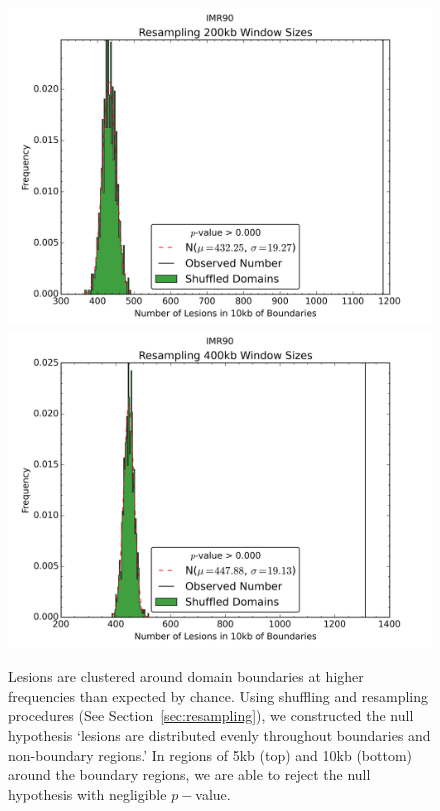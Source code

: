 \begin{figure}[H]
  \vfill

  \begin{minipage}{0.5\textwidth}%
    \includegraphics[width=\textwidth]{./figures/supplementary/domains/IMR90boundaries200kbwindows10000kbslop.png}
  \end{minipage}%
  \hfill
  \begin{minipage}{0.5\textwidth}
    \includegraphics[width=\textwidth]{./figures/supplementary/domains/IMR90boundaries400kbwindows10000kbslop.png}
  \end{minipage}
  \medskip
  \small
  Lesions are clustered around domain boundaries at higher frequencies than expected by chance.  Using shuffling and
  resampling procedures (See Section~\ref{sec:resampling}), we constructed the null hypothesis `lesions are distributed evenly
  throughout boundaries and non-boundary regions.'  In regions of 5kb (top) and 10kb (bottom) around the boundary regions, we are
  able to reject the null hypothesis with negligible $p-$value.
\end{figure}

